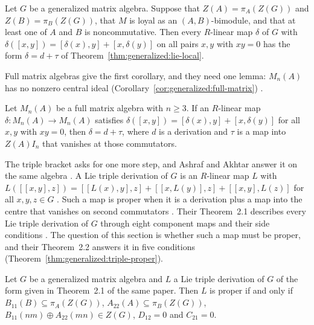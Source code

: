 \begin{theorem}\label{thm:generalized:lie-loyal}
Let $G$ be a generalized matrix algebra. Suppose that $Z(A)=\pi_A(Z(G))$ and
$Z(B)=\pi_B(Z(G))$, that $M$ is loyal as an $(A,B)$-bimodule, and that at least
one of $A$ and $B$ is noncommutative. Then every $R$-linear map $\delta$ of $G$
with $\delta([x,y])=[\delta(x),y]+[x,\delta(y)]$ on all pairs $x,y$ with $xy=0$
has the form $\delta=d+\tau$ of Theorem~\ref{thm:generalized:lie-local}.
\end{theorem}

Full matrix algebras give the first corollary, and they need one lemma:
$M_n(A)$ has no nonzero central ideal (Corollary~\ref{cor:generalized:full-matrix}) \cite[Lemma~1, p.~2726]{DuWang2012}.

\begin{corollary}\label{cor:generalized:full-matrix}
Let $M_n(A)$ be a full matrix algebra with $n\ge 3$. If an $R$-linear map
$\delta\colon M_n(A)\to M_n(A)$ satisfies
$\delta([x,y])=[\delta(x),y]+[x,\delta(y)]$ for all $x,y$ with $xy=0$, then
$\delta=d+\tau$, where $d$ is a derivation and $\tau$ is a map into $Z(A)I_n$
that vanishes at those commutators.
\end{corollary}

The triple bracket asks for one more step, and Ashraf and Akhtar answer it on the
same algebra \cite[p.~3651]{AshrafAkhtar2020}. A Lie triple derivation of $G$ is an
$R$-linear map $L$ with $L([[x,y],z])=[[L(x),y],z]+[[x,L(y)],z]+[[x,y],L(z)]$ for
all $x,y,z\in G$ \cite[p.~3651]{AshrafAkhtar2020}. Such a map is proper when it is a
derivation plus a map into the centre that vanishes on second commutators
\cite[p.~3651]{AshrafAkhtar2020}. Their Theorem~2.1 describes every Lie triple
derivation of $G$ through eight component maps and their side conditions
\cite[Theorem~2.1, pp.~3653--3654]{AshrafAkhtar2020}. The question of this section
is whether such a map must be proper, and their Theorem~2.2 answers it in five
conditions \cite[Theorem~2.2, p.~3657]{AshrafAkhtar2020} (Theorem~\ref{thm:generalized:triple-proper}).

\begin{theorem}\label{thm:generalized:triple-proper}
Let $G$ be a generalized matrix algebra and $L$ a Lie triple derivation of $G$ of
the form given in Theorem~2.1 of the same paper. Then $L$ is proper if and only if
$B_{11}(B)\subseteq\pi_A(Z(G))$, $A_{22}(A)\subseteq\pi_B(Z(G))$,
$B_{11}(nm)\oplus A_{22}(mn)\in Z(G)$, $D_{12}=0$ and $C_{21}=0$.
\end{theorem}


